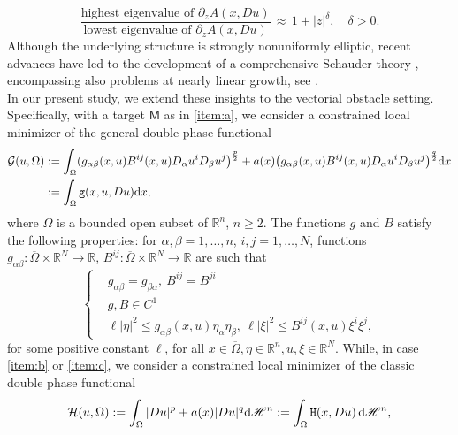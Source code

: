 \documentclass[a4paper]{amsart}
\theoremstyle{plain}  %
\numberwithin{equation}{section}
\def \d{\,{\rm d}}
\newcommand{\R}{\mathbb{R}}
\newcommand{\mm}{\mathsf{M}}
\newcommand{\ff}{\tx{H}}
\newcommand{\tx}[1]{\textnormal{\texttt{#1}}}
\begin{document}
\begin{equation*}
\displaystyle \frac{\text{highest eigenvalue of }\partial_z A(x, Du)} {\text{lowest eigenvalue of }\partial_z A(x, Du)}\,\approx\, 1 + |z|^{\delta}, \quad \delta >0.
\end{equation*}
Although the underlying structure is strongly nonuniformly elliptic, recent advances have led to the development of a comprehensive Schauder theory \cite{DefS1, DefS3}, encompassing also problems at nearly linear growth, see \cite{DefS2, DFP, DFDFP}.\\

\noindent In our present study, we extend these insights to the vectorial obstacle setting.  Specifically, with a target $\mm$ as in \ref{item:a}, we consider  a  constrained local minimizer of the general double phase functional
\begin{align}\label{functionalG}
\mathcal{G}(u,\Omega)  &:=  \int_{\Omega} (g_{\alpha \beta}(x,u) B^{ij}(x, u) D_{\alpha}u^i D_{\beta}u^j\bigr)^{\frac{p}{2}} 
+
 a(x)\bigl(g_{\alpha \beta}(x,u) B^{ij}(x, u) D_{\alpha}u^i D_{\beta}u^j\bigr)^{\frac{q}{2}} \mathrm{d}x \notag \\ & :=  \int_{\Omega} \tx{g}(x,u,Du) \mathrm{d}x,
\end{align}
where $\Omega$  is a bounded open subset of $\R^n$, $n\geq 2$. The functions \(g\) and \(B\)  satisfy the following properties: for $\alpha,\beta=1,\dots,n$, $i,j=1,\dots,N$, functions $g_{\alpha\beta}: \overline{\Omega} \times \mathbb{R}^N  \to \mathbb{R}$, $B^{ij}: \overline{\Omega}\times \mathbb{R}^N \to \mathbb{R}$ are such that
\begin{equation} \label{ellipticity}
\begin{cases}
& g_{\alpha \beta} = g_{\beta \alpha}, \ B^{ij} = B^{ji} \\
    & g, B \in C^1 \\ 
    & \ell |\eta|^2 \leq g_{\alpha\beta}(x,u)\eta_\alpha \eta_\beta, \ \ell |\xi|^2 \leq  B^{ij}(x,u) \xi^i \xi^j ,
\end{cases}   
\end{equation}
for some positive constant $\ell$, for all $x \in \overline{\Omega}, \eta  \in \R^n, u,\xi \in \R^N$. 
While, in case \ref{item:b} or \ref{item:c}, we consider a constrained local minimizer of the classic double phase functional 
  \begin{equation}\label{functional}
\mathcal{H}(u,\Omega) := \int_{\Omega} |Du|^p + a(x) |Du|^q  \mathrm{d}\mathscr{H}^n:= \int_\Omega \ff(x,Du) \d\mathscr{H}^n,
\end{equation}
\end{document}
